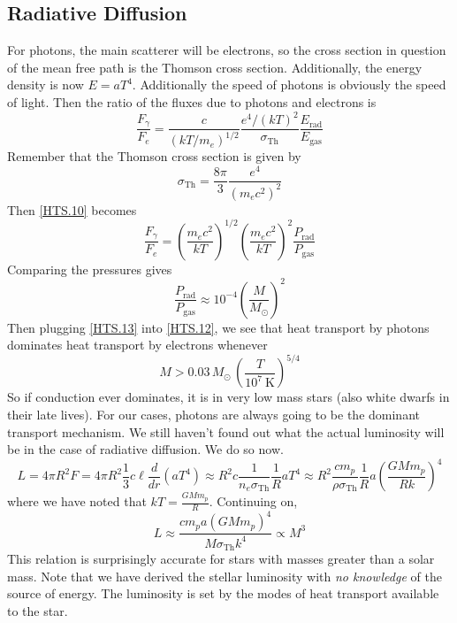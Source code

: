 \documentclass[10pt]{article}
\numberwithin{equation}{section}
\begin{document}
	\subsection{Radiative Diffusion}
	For photons, the main scatterer will be electrons, so the cross section in question of the mean free path is the Thomson cross section. Additionally, the energy density is now $E=aT^4$. Additionally the speed of photons is obviously the speed of light. Then the ratio of the fluxes due to photons and electrons is
	\begin{equation}
		\label{HTS.10} \frac{F_{\gamma}}{F_e}=\frac{c}{(kT/m_e)^{1/2}}\frac{e^4/(kT)^2}{\sigma_{\mathrm{Th}}}\frac{E_{\mathrm{rad}}}{E_{\mathrm{gas}}}
	\end{equation}
	Remember that the Thomson cross section is given by
	\begin{equation}
		\label{HTS.11} \sigma_{\mathrm{Th}}=\frac{8\pi}{3}\frac{e^4}{(m_ec^2)^2}
	\end{equation}
	Then \eqref{HTS.10} becomes
	\begin{equation}
		\label{HTS.12} \frac{F_\gamma}{F_e}=\left(\frac{m_ec^2}{kT}\right)^{1/2}\left(\frac{m_ec^2}{kT}\right)^2\frac{P_{\mathrm{rad}}}{P_{\mathrm{gas}}}
	\end{equation}
	Comparing the pressures gives
	\begin{equation}
		\label{HTS.13} \frac{P_{\mathrm{rad}}}{P_{\mathrm{gas}}}\approx 10^{-4}\left(\frac{M}{M_\odot}\right)^2
	\end{equation}
	Then plugging \eqref{HTS.13} into \eqref{HTS.12}, we see that heat transport by photons dominates heat transport by electrons whenever
	\begin{equation}
		\label{HTS.14} M>0.03\,M_\odot\,\left(\frac{T}{10^7\ \mathrm{K}}\right)^{5/4}
	\end{equation}
	So if conduction ever dominates, it is in very low mass stars (also white dwarfs in their late lives). For our cases, photons are always going to be the dominant transport mechanism. We still haven't found out what the actual luminosity will be in the case of radiative diffusion. We do so now.
	\begin{equation}
		\label{HTS.15} L=4\pi R^2 F=4\pi R^2\frac{1}{3}c\ell\frac{d}{dr}\left(aT^4\right)\approx R^2c\frac{1}{n_e\sigma_{\mathrm{Th}}}\frac{1}{R}aT^4\approx R^2\frac{c m_p}{\rho\sigma_{\mathrm{Th}}}\frac{1}{R}a\left(\frac{GMm_p}{Rk}\right)^4
	\end{equation}
	where we have noted that $kT=\frac{GMm_p}{R}$. Continuing on,
	\begin{equation}
		\label{HTS.16} L\approx \frac{cm_pa(GMm_p)^4}{M\sigma_{\mathrm{Th}}k^4}\propto M^3
	\end{equation}
	This relation is surprisingly accurate for stars with masses greater than a solar mass. Note that we have derived the stellar luminosity with \emph{no knowledge} of the source of energy. The luminosity is set by the modes of heat transport available to the star.\\
	
\end{document}
